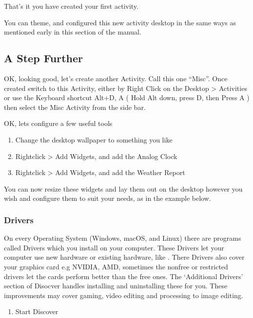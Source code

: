 \documentclass[letterpaper,10pt,english]{sphinxmanual}
\begin{document}
\sphinxAtStartPar
That’s it you have created your first activity.

\sphinxAtStartPar
You can theme, and configured this new activity desktop in the same ways as mentioned early in this section of the manual.


\subsection{A Step Further}
\label{\detokenize{docs/desktop-guide/advanced:a-step-further}}
\sphinxAtStartPar
OK, looking good, let’s create another Activity. Call this one “Misc”. Once created switch to this Activity, either by Right Click on the Desktop \textgreater{} Activities or use the Keyboard shortcut Alt+D, A ( Hold Alt down, press D, then Press A ) then select the Misc Activity from the side bar.

\sphinxAtStartPar
OK, lets configure a few useful tools
\begin{enumerate}
%
\item {} 
\sphinxAtStartPar
Change the desktop wallpaper to something you like

\item {} 
\sphinxAtStartPar
Right\sphinxhyphen{}click \textgreater{} Add Widgets, and add the Analog Clock

\item {} 
\sphinxAtStartPar
Right\sphinxhyphen{}click \textgreater{} Add Widgets, and add the Weather Report

\end{enumerate}

\sphinxAtStartPar
You can now resize these widgets and lay them out on the desktop however you wish and configure them to suit your needs, as in the example below.



\subsubsection{Drivers}
\label{\detokenize{docs/desktop-guide/advanced:drivers}}
\sphinxAtStartPar
On every Operating System (Windows, macOS, and Linux) there are programs called Drivers which you install on your computer. These Drivers let your computer use new hardware or existing hardware, like . There Drivers also cover your graphics card e.g NVIDIA, AMD, sometimes the nonfree or restricted drivers let the cards perform better than the free ones. The ‘Additional Drivers’ section of Disocver handles installing and uninstalling these for you. These improvements may cover gaming, video editing and processing to image editing.
\begin{enumerate}
%
\item {} 
\sphinxAtStartPar
Start Discover

\end{enumerate}
\end{document}
